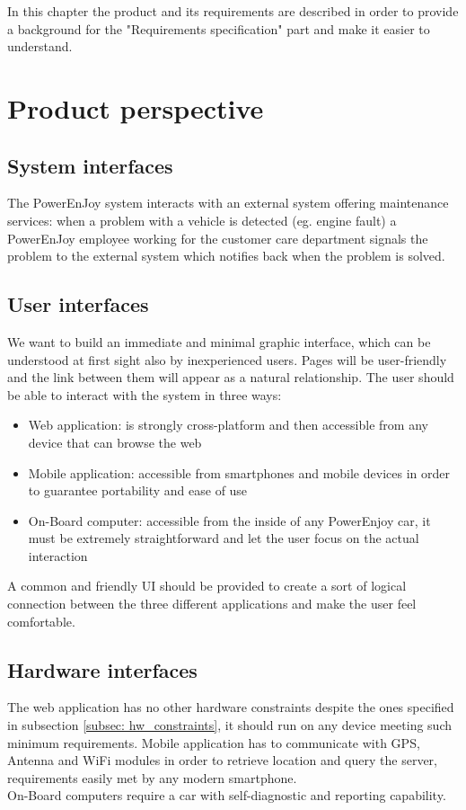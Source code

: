 In this chapter the product and its requirements are described in order to provide a background for the "Requirements specification" part and make it easier to understand.

\section{Product perspective}

\subsection{System interfaces} %
\label{subsec:system_interfaces}
The PowerEnJoy system interacts with an external system offering maintenance services: when a problem with a vehicle is detected (eg. engine fault) a PowerEnJoy employee working for the customer care department signals the problem to the external system which notifies back when the problem is solved.

\subsection{User interfaces} %
\label{subsec:user_interfaces}
We want to build an immediate and minimal graphic interface, which can be understood at first sight also by inexperienced users. Pages will be user-friendly and the link between them will appear as a natural relationship.
The user should be able to interact with the system in three ways:
\begin{itemize}
	\item{Web application}: is strongly cross-platform and then accessible from any device that can browse the web
	\item{Mobile application}: accessible from smartphones and mobile devices in order to guarantee portability and ease of use
	\item{On-Board computer}: accessible from the inside of any PowerEnjoy car, it must be extremely straightforward and let the user focus on the actual interaction
\end{itemize}
A common and friendly UI should be provided to create a sort of logical connection between the three different applications and make the user feel comfortable. 

\subsection{Hardware interfaces}
The web application has no other hardware constraints despite the ones specified in subsection \ref{subsec: hw_constraints}, it should run on any device meeting such minimum requirements. Mobile application has to communicate with GPS, Antenna and WiFi modules in order to retrieve location and query the server, requirements easily met by any modern smartphone.
\\On-Board computers require a car with self-diagnostic and reporting capability.

